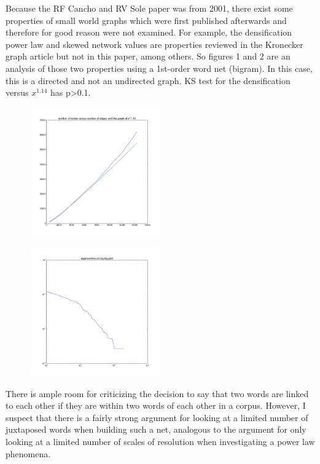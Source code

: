 \documentclass[12pt]{article}
\begin{document}
Because the RF Cancho and RV Sole paper was from 2001, there exist some properties of small world graphs which were first published afterwards and therefore for good reason were not examined. For example, the densification power law and skewed network values are properties reviewed in the Kronecker graph article but not in this paper, among others. So figures 1 and 2 are an analysis of those two properties using a 1st-order word net (bigram). In this case, this is a directed and not an undirected graph. KS test for the densification versus $x^{1.14}$ has p>0.1. %

\begin{figure}
  \includegraphics[width=0.5\textwidth]{densification_plot.png}
\end{figure}

\begin{figure}
  \includegraphics[width=0.5\textwidth]{eigenvector_loglog.png}
\end{figure}

There is ample room for criticizing the decision to say that two words are linked to each other if they are within two words of each other in a corpus. However, I suspect that there is a fairly strong argument for looking at a limited number of juxtaposed words when building such a net, analogous to the argument for only looking at a limited number of scales of resolution when investigating a power law phenomena. %
\end{document}
